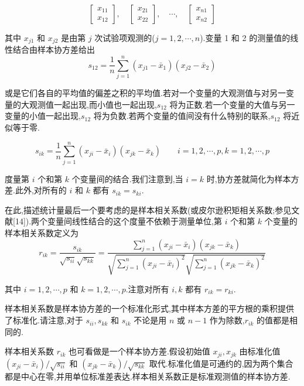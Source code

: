 \[
\begin{bmatrix} x_{11} \\ x_{12} \end{bmatrix},\quad
\begin{bmatrix} x_{21} \\ x_{22} \end{bmatrix},\quad \cdots,\quad
\begin{bmatrix} x_{n1} \\ x_{n2} \end{bmatrix}
\]

其中 $x_{j1}$ 和 $x_{j2}$ 是由第 $j$ 次试验项观测的($j=1,2,\cdots,n$).变量 1 和 2 的测量值的线性结合由样本协方差给出
\[
s_{12} = \frac{1}{n}\sum_{j=1}^{n}(x_{j1}-\bar{x}_1)(x_{j2}-\bar{x}_2)
\]

或是它们各自的平均值的偏差之积的平均值.若对一个变量的大观测值与对另一变量的大观测值一起出现,而小值也一起出现,$s_{12}$ 将为正数.若一个变量的大值与另一变量的小值一起出现,$s_{12}$ 将为负数.若两个变量的值间没有什么特别的联系,$s_{12}$ 将近似等于零.

\label{eq:1-4}
\begin{equation}
s_{ik} = \frac{1}{n}\sum_{j=1}^{n}(x_{ji}-\bar{x}_i)(x_{jk}-\bar{x}_k) \qquad i=1,2,\cdots,p, k=1,2,\cdots,p \tag{1-4}
\end{equation}

度量第 $i$ 个和第 $k$ 个变量间的结合.我们注意到,当 $i=k$ 时,协方差就简化为样本方差.此外,对所有的 $i$ 和 $k$ 都有 $s_{ik}=s_{ki}$.

在此,描述统计量最后一个要考虑的是样本相关系数(或皮尔逊积矩相关系数;参见文献[14]).两个变量间线性结合的这个度量不依赖于测量单位,第 $i$ 个和第 $k$ 个变量的样本相关系数定义为
\label{eq:1-5}
\begin{equation}
r_{ik} = \frac{s_{ik}}{\sqrt{s_{ii}}\sqrt{s_{kk}}} = \frac{\sum\limits_{j=1}^{n}(x_{ji}-\bar{x}_i)(x_{jk}-\bar{x}_k)}{\sqrt{\sum\limits_{j=1}^{n}(x_{ji}-\bar{x}_i)^2}\sqrt{\sum\limits_{j=1}^{n}(x_{jk}-\bar{x}_k)^2}} \tag{1-5}
\end{equation}

其中 $i=1,2,\cdots,p$ 和 $k=1,2,\cdots,p$.注意对所有 $i,k$ 都有 $r_{ik}=r_{ki}$.

样本相关系数是样本协方差的一个标准化形式,其中样本方差的平方根的乘积提供了标准化.请注意,对于 $s_{ii},s_{kk}$ 和 $s_{ik}$ 不论是用 $n$ 或 $n-1$ 作为除数,$r_{ik}$ 的值都是相同的.

样本相关系数 $r_{ik}$ 也可看做是一个样本协方差.假设初始值 $x_{ji},x_{jk}$ 由标准化值 $(x_{ji}-\bar{x}_i)/\sqrt{s_{ii}}$ 和 $(x_{jk}-\bar{x}_k)/\sqrt{s_{kk}}$ 取代.标准化值是可通约的,因为两个集合都是中心在零,并用单位标准差表达.样本相关系数正是标准观测值的样本协方差.

